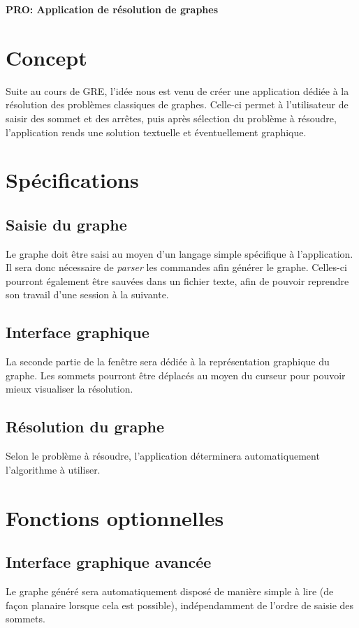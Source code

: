 \documentclass[french]{article}
\begin{document}
	\centering
	\large{\textbf{PRO: Application de résolution de graphes}}
	
	\justify
	
	\section{Concept}
		Suite au cours de GRE, l'idée nous est venu de créer une application dédiée à la résolution des problèmes classiques de graphes. Celle-ci permet à l'utilisateur de saisir des sommet et des arrêtes, puis après sélection du problème à résoudre, l'application rends une solution textuelle et éventuellement graphique.
		
	\section{Spécifications}
		\subsection{Saisie du graphe}
			Le graphe doit être saisi au moyen d'un langage simple spécifique à l'application. Il sera donc nécessaire de \textit{parser} les commandes afin générer le graphe. Celles-ci pourront également être sauvées dans un fichier texte, afin de pouvoir reprendre son travail d'une session à la suivante.
		
		\subsection{Interface graphique}
			La seconde partie de la fenêtre sera dédiée à la représentation graphique du graphe. Les sommets pourront être déplacés au moyen du curseur pour pouvoir mieux visualiser la résolution.
		
		\subsection{Résolution du graphe}
			Selon le problème à résoudre, l'application déterminera automatiquement l'algorithme à utiliser.
	
	\section{Fonctions optionnelles}
		\subsection{Interface graphique avancée}
			Le graphe généré sera automatiquement disposé de manière simple à lire (de façon planaire lorsque cela est possible), indépendamment de l'ordre de saisie des sommets.
		
\end{document}
